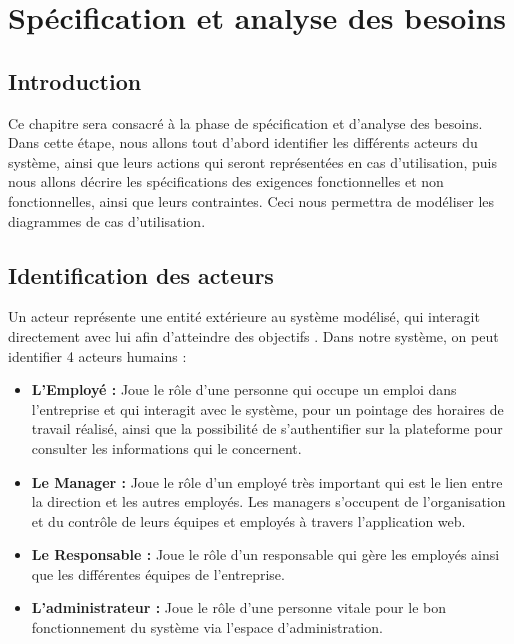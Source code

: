 \chapter{Spécification et analyse des besoins
}
\renewcommand{\headrulewidth}{1pt}


\section{Introduction}
Ce chapitre sera consacré à la phase de spécification et d’analyse des besoins.
Dans cette étape, nous allons tout d’abord identifier les différents acteurs du
système, ainsi que leurs actions qui seront représentées en cas d’utilisation,
puis nous allons décrire les spécifications des exigences fonctionnelles et non
fonctionnelles, ainsi que leurs contraintes. Ceci nous permettra de modéliser les
diagrammes de cas d’utilisation. 

\section{Identification des acteurs}
Un acteur représente une entité extérieure au système modélisé, qui interagit
directement avec lui afin d’atteindre des objectifs \cite{4}. Dans notre
système, on peut identifier 4 acteurs humains :
    
    
\begin{itemize}
    \item[\textbullet] \textbf{L’Employé :} Joue le rôle d’une personne 			qui occupe un emploi dans l’entreprise et qui interagit avec le 			système, pour un pointage des horaires de travail réalisé, ainsi 			que la possibilité de s’authentifier sur la plateforme pour 				consulter les informations qui le concernent.
    \item[\textbullet] \textbf{Le Manager :} Joue le rôle d’un employé 				très important qui est le lien entre la direction et les autres 			employés. Les managers s’occupent de l’organisation et du contrôle 		de leurs équipes et employés à travers l'application web.
    \item[\textbullet] \textbf{Le Responsable :} Joue le rôle d’un 					responsable qui gère les employés ainsi que les différentes 				équipes de l’entreprise.
    \item[\textbullet] \textbf{L’administrateur :} Joue le rôle d’une 				personne vitale pour le bon fonctionnement du système via l’espace 		d’administration.
\end{itemize}
    
